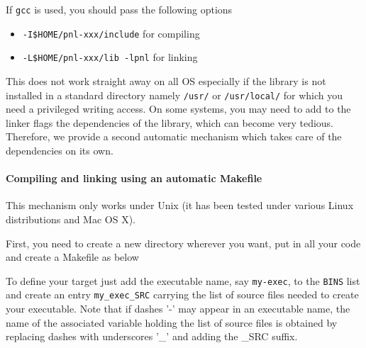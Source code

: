 \documentclass[a4paper,11pt,twoside]{article}
\begin{document}
If \verb!gcc! is used, you should pass the following options
\begin{itemize}
\item \verb!-I$HOME/pnl-xxx/include! for compiling
\item \verb!-L$HOME/pnl-xxx/lib -lpnl! for linking
\end{itemize}
This does not work straight away on all OS especially if the library is not
installed in a standard directory namely \verb+/usr/+ or \verb+/usr/local/+ for
which you need a privileged writing access.
On some systems, you may need to add to the linker flags the dependencies of the
library, which can become very tedious. Therefore, we provide a second automatic
mechanism which takes care of the dependencies on its own.

\paragraph{Compiling and linking using an automatic Makefile}

This mechanism only works under Unix (it has been tested under various Linux
distributions and Mac OS X).

First, you need to create a new directory wherever you want, put in all your
code and create a Makefile as below

To define your target just add the executable name, say \verb!my-exec!, to the
\verb!BINS!  list and create an entry \verb!my_exec_SRC! carrying the list
of source files needed to create your executable.  Note that if dashes '-' may
appear in an executable name, the name of the associated variable holding the
list of source files is obtained by replacing dashes with underscores '_' and
adding the _SRC suffix.
\end{document}

